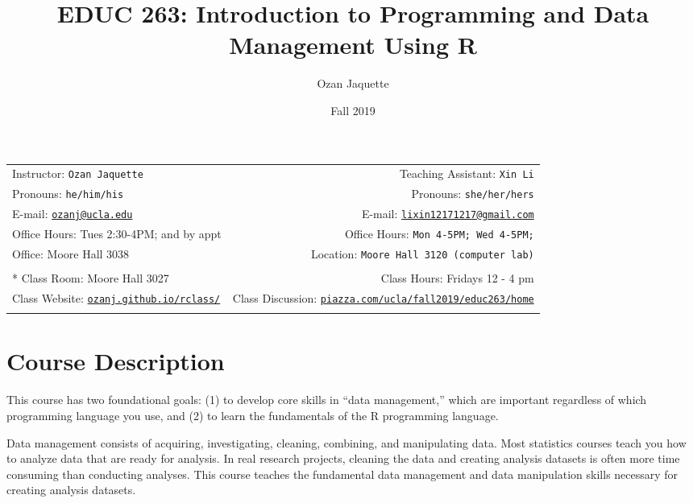 \documentclass[11pt,]{article}
\title{EDUC 263: Introduction to Programming and Data Management Using
R}
\author{Ozan Jaquette}
\date{Fall 2019}
\begin{document}
  

		\maketitle
		
	
		\thispagestyle{firststyle}



	\noindent \begin{tabular*}{\textwidth}{ @{\extracolsep{\fill}} lr @{\extracolsep{\fill}}}


Instructor: \texttt{Ozan Jaquette} & Teaching Assistant: \texttt{Xin
Li} \\
Pronouns: \texttt{he/him/his} & Pronouns: \texttt{she/her/hers} \\
E-mail: \texttt{\href{mailto:ozanj@ucla.edu}{\nolinkurl{ozanj@ucla.edu}}} & E-mail: \texttt{\href{mailto:lixin12171217@gmail.com}{\nolinkurl{lixin12171217@gmail.com}}} \\ 
Office Hours: Tues 2:30-4PM; and by appt  & Office Hours: \texttt{Mon
4-5PM; Wed 4-5PM;} \\
Office: Moore Hall 3038 & Location: \texttt{Moore Hall 3120 (computer
lab)} \\
\\ *
Class Room: Moore Hall 3027 & Class Hours: Fridays 12 - 4 pm\\
Class Website: \href{http://ozanj.github.io/rclass/}{\tt ozanj.github.io/rclass/} & Class Discussion: \href{http://piazza.com/ucla/fall2019/educ263/home}{\tt piazza.com/ucla/fall2019/educ263/home}\\
	&  \\
	\hline
	\end{tabular*}
	
\vspace{2mm}
	


\hypertarget{course-description}{%
\section{Course Description}\label{course-description}}

This course has two foundational goals: (1) to develop core skills in
``data management,'' which are important regardless of which programming
language you use, and (2) to learn the fundamentals of the R programming
language.

Data management consists of acquiring, investigating, cleaning,
combining, and manipulating data. Most statistics courses teach you how
to analyze data that are ready for analysis. In real research projects,
cleaning the data and creating analysis datasets is often more time
consuming than conducting analyses. This course teaches the fundamental
data management and data manipulation skills necessary for creating
analysis datasets.
\end{document}
